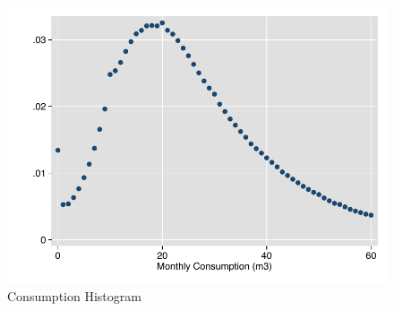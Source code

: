 \documentclass[12pt,table]{article}
\begin{document}
\begin{figure}
\begin{center}
\caption{Consumption Histogram}
\includegraphics[scale=1]{tables/consumption_histogram.pdf}
\end{center}
\end{figure}


{
\small
\nocite{*}


}



%  

%    



%
\end{document}
